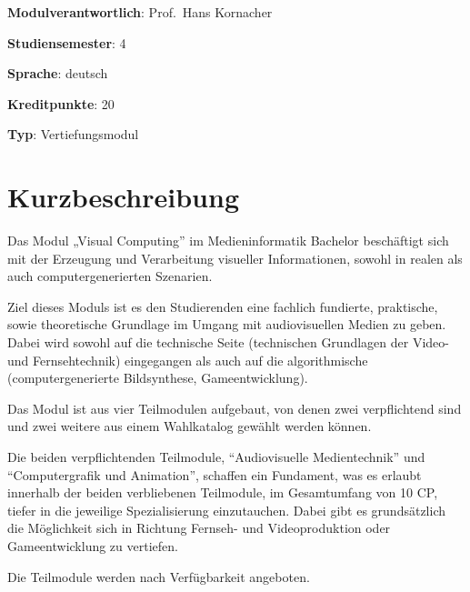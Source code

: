 \begin{modulHead}
\textbf{Modulverantwortlich}: Prof.~Hans
Kornacher
\end{modulHead}
\begin{modulHead}
\textbf{Studiensemester}:
4
\end{modulHead}
\begin{modulHead}
\textbf{Sprache}:
deutsch
\end{modulHead}
\begin{modulHead}
\textbf{Kreditpunkte}:
20
\end{modulHead}
\begin{modulHead}
\textbf{Typ}:
Vertiefungsmodul
\end{modulHead}


\hypertarget{kurzbeschreibungpathlabelmi-2017modulbeschreibungen-bachelorba_vertiefung-visual-computing}{%
\section*{Kurzbeschreibung\label{/mi-2017/modulbeschreibungen-bachelor/BA_Vertiefung-Visual-Computing}}\label{kurzbeschreibungpathlabelmi-2017modulbeschreibungen-bachelorba_vertiefung-visual-computing}}

Das Modul „Visual Computing'' im Medieninformatik Bachelor beschäftigt
sich mit der Erzeugung und Verarbeitung visueller Informationen, sowohl
in realen als auch computergenerierten Szenarien.

Ziel dieses Moduls ist es den Studierenden eine fachlich fundierte,
praktische, sowie theoretische Grundlage im Umgang mit audiovisuellen
Medien zu geben. Dabei wird sowohl auf die technische Seite (technischen
Grundlagen der Video- und Fernsehtechnik) eingegangen als auch auf die
algorithmische (computergenerierte Bildsynthese, Gameentwicklung).

Das Modul ist aus vier Teilmodulen aufgebaut, von denen zwei
verpflichtend sind und zwei weitere aus einem Wahlkatalog gewählt werden
können.

Die beiden verpflichtenden Teilmodule, ``Audiovisuelle Medientechnik''
und ``Computergrafik und Animation'', schaffen ein Fundament, was es
erlaubt innerhalb der beiden verbliebenen Teilmodule, im Gesamtumfang
von 10 CP, tiefer in die jeweilige Spezialisierung einzutauchen. Dabei
gibt es grundsätzlich die Möglichkeit sich in Richtung Fernseh- und
Videoproduktion oder Gameentwicklung zu vertiefen.

Die Teilmodule werden nach Verfügbarkeit angeboten.

